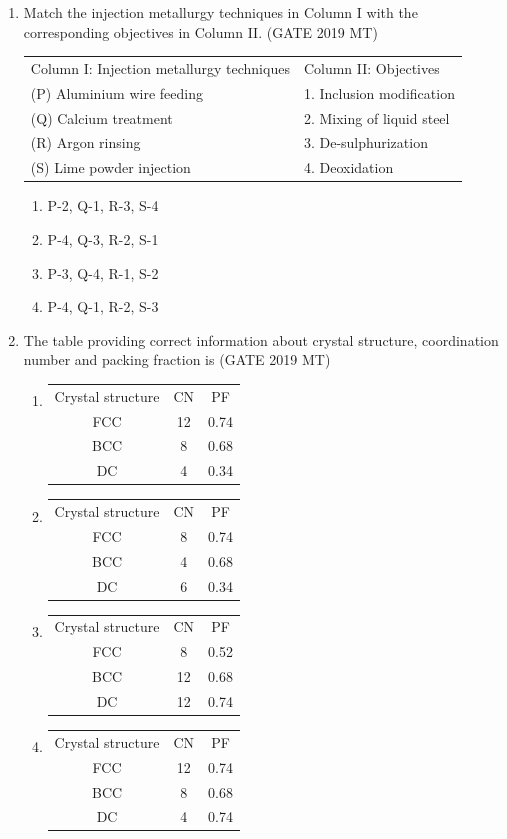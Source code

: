 \documentclass[12pt]{article}
\begin{document}
\begin{enumerate}
\item Match the injection metallurgy techniques in Column I with the corresponding objectives in Column II. (GATE 2019 MT)
\begin{center}
\begin{tabular}{ll}
Column I: Injection metallurgy techniques & Column II: Objectives \\
(P) Aluminium wire feeding    & 1. Inclusion modification \\
(Q) Calcium treatment         & 2. Mixing of liquid steel \\
(R) Argon rinsing             & 3. De-sulphurization \\
(S) Lime powder injection     & 4. Deoxidation \\
\end{tabular}
\end{center}
\begin{enumerate}[label=(\alph*)]
    \item P-2, Q-1, R-3, S-4
    \item P-4, Q-3, R-2, S-1
    \item P-3, Q-4, R-1, S-2
    \item P-4, Q-1, R-2, S-3
\end{enumerate}

\item The table providing correct information about crystal structure, coordination number and packing fraction is (GATE 2019 MT)
\begin{enumerate}[label=(\alph*)]
    \item \begin{tabular}{ccc} Crystal structure & CN & PF \\ FCC & 12 & 0.74 \\ BCC & 8 & 0.68 \\ DC & 4 & 0.34 \end{tabular}
    \item \begin{tabular}{ccc} Crystal structure & CN & PF \\ FCC & 8 & 0.74 \\ BCC & 4 & 0.68 \\ DC & 6 & 0.34 \end{tabular}
    \item \begin{tabular}{ccc} Crystal structure & CN & PF \\ FCC & 8 & 0.52 \\ BCC & 12 & 0.68 \\ DC & 12 & 0.74 \end{tabular}
    \item \begin{tabular}{ccc} Crystal structure & CN & PF \\ FCC & 12 & 0.74 \\ BCC & 8 & 0.68 \\ DC & 4 & 0.74 \end{tabular}
\end{enumerate}


\end{enumerate}
\end{document}
